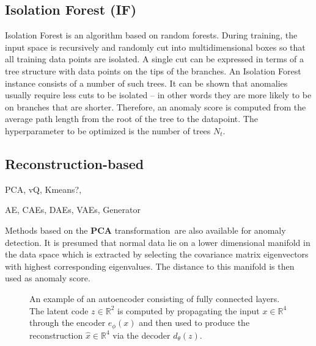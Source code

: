\subsection{Isolation Forest (IF)}
Isolation Forest \cite{liu2008isolation} is an algorithm based on random forests. During training, the input space is recursively and randomly cut into multidimensional boxes so that all training data points are isolated. A single cut can be expressed in terms of a tree structure with data points on the tips of the branches. An Isolation Forest instance consists of a number of such trees. It can be shown that anomalies usually require less cuts to be isolated -- in other words they are more likely to be on branches that are shorter. Therefore, an anomaly score is computed from the average path length from the root of the tree to the datapoint. The hyperparameter to be optimized is the number of trees $N_t$.

\subsection{Reconstruction-based}

PCA, vQ, Kmeans?, 

AE, CAEs, DAEs, VAEs, Generator

Methods based on the \textbf{PCA }transformation\,\cite{shyu2003novel,aggarwal2015outlier}\textbf{
}are also available for anomaly detection. It is presumed that normal
data lie on a lower dimensional manifold in the data space which is
extracted by selecting the covariance matrix eigenvectors with highest
corresponding eigenvalues. The distance to this manifold is then used
as anomaly score.


\begin{figure}
\begin{centering}

\par\end{centering}
\centering{}\caption{An example of an autoencoder consisting of fully connected layers.
The latent code $z\in\mathbb{R}^{2}$ is computed by propagating the
input $x\in\mathbb{R}^{4}$ through the encoder $e_{\phi}(x)$ and
then used to produce the reconstruction $\hat{x}\in\mathbb{R}^{4}$
via the decoder $d_{\theta}(z)$.}
\label{fig:ae}
\end{figure}

